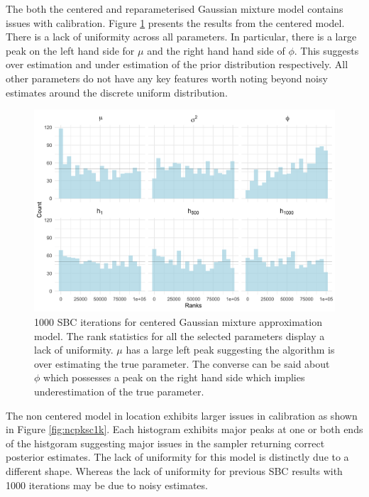\documentclass[12pt, a4paper]{article}
\begin{document}
    The both the centered and reparameterised Gaussian mixture model contains issues with calibration. Figure \ref{fig:cpksc1k} presents the results from the centered model. There is a lack of uniformity across all parameters. In particular, there is a large peak on the left hand side for $\mu$ and the right hand hand side of $\phi$. This suggests over estimation and under estimation of the prior distribution respectively. All other parameters do not have any key features worth noting beyond noisy estimates around the discrete uniform distribution. 

    \begin{figure}[H]
        \centering
        \includegraphics[scale=0.1]{results/ksc_cp_1k.png}
        \caption{1000 SBC iterations for centered Gaussian mixture approximation model. The rank statistics for all the selected parameters display a lack of uniformity. $\mu$ has a large left peak suggesting the algorithm is over estimating the true parameter. The converse can be said about $\phi$ which possesses a peak on the right hand side which implies underestimation of the true parameter.}
        \label{fig:cpksc1k}
    \end{figure}

    The non centered model in location exhibits larger issues in calibration as shown in Figure \ref{fig:ncpksc1k}. Each histogram exhibits major peaks at one or both ends of the histgoram suggesting major issues in the sampler returning correct posterior estimates. The lack of uniformity for this model is distinctly due to a different shape. Whereas the lack of uniformity for previous SBC results with 1000 iterations may be due to noisy estimates. 
\end{document}
